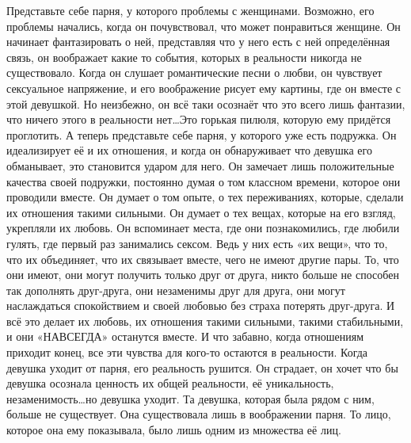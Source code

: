 Представьте себе парня, у которого проблемы с женщинами. Возможно, его проблемы начались, когда он почувствовал, что может понравиться женщине. Он начинает фантазировать о ней, представляя что у него есть с ней определённая связь, он воображает какие то события, которых в реальности никогда не существовало. Когда он слушает романтические песни о любви, он чувствует сексуальное напряжение, и его воображение рисует ему картины, где он вместе с этой девушкой. Но неизбежно, он всё таки осознаёт что это всего лишь фантазии, что ничего этого в реальности нет\ldots Это горькая пилюля, которую ему придётся проглотить. А теперь представьте себе парня, у которого уже есть подружка. Он идеализирует её и их отношения, и когда он обнаруживает что девушка его обманывает, это становится ударом для него. Он замечает лишь положительные качества своей подружки, постоянно думая о том классном времени, которое они проводили вместе. Он думает о том опыте, о тех переживаниях, которые, сделали их отношения такими сильными. Он думает о тех вещах, которые на его взгляд, укрепляли их любовь. Он вспоминает места, где они познакомились, где любили гулять, где первый раз занимались сексом. Ведь у них есть «их вещи», что то, что их объединяет, что их связывает вместе, чего не имеют другие пары. То, что они имеют, они могут получить только друг от друга, никто больше не способен так дополнять друг-друга, они незаменимы друг для друга, они могут наслаждаться спокойствием и своей любовью без страха потерять друг-друга. И всё это делает их любовь, их отношения такими сильными, такими стабильными, и они «НАВСЕГДА» останутся вместе. И что забавно, когда отношениям приходит конец, все эти чувства для кого-то остаются в реальности. Когда девушка уходит от парня, его реальность рушится. Он страдает, он хочет что бы девушка осознала ценность их общей реальности, её уникальность, незаменимость\ldots но девушка уходит. Та девушка, которая была рядом с ним, больше не существует. Она существовала лишь в воображении парня. То лицо, которое она ему показывала, было лишь одним из множества её лиц.

